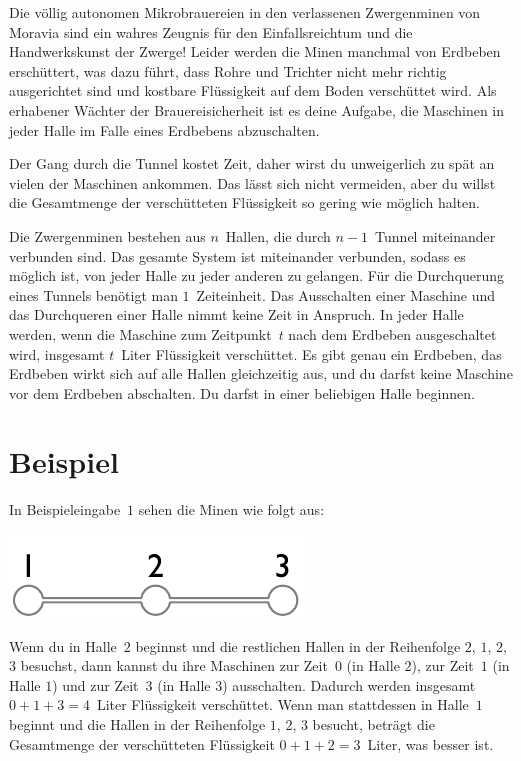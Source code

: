 
\noindent
Die völlig autonomen Mikrobrauereien in den verlassenen Zwergenminen von Moravia sind ein wahres Zeugnis für den Einfallsreichtum und die Handwerkskunst der Zwerge!
Leider werden die Minen manchmal von Erdbeben erschüttert, was dazu führt, dass Rohre und Trichter nicht mehr richtig ausgerichtet sind und kostbare Flüssigkeit auf dem Boden verschüttet wird.
Als erhabener Wächter der Brauereisicherheit ist es deine Aufgabe, die Maschinen in jeder Halle im Falle eines Erdbebens abzuschalten.

Der Gang durch die Tunnel kostet Zeit, 
daher wirst du unweigerlich zu spät an vielen der Maschinen ankommen.
Das lässt sich nicht vermeiden, aber du willst die Gesamtmenge der verschütteten Flüssigkeit so gering wie möglich halten.

\medskip
Die Zwergenminen bestehen aus $n$~Hallen, die durch $n-1$~Tunnel miteinander verbunden sind.
Das gesamte System ist miteinander verbunden, sodass es möglich ist, von jeder Halle zu jeder anderen zu gelangen.
Für die Durchquerung eines Tunnels benötigt man $1$~Zeiteinheit.
Das Ausschalten einer Maschine und das Durchqueren einer Halle nimmt keine Zeit in Anspruch.
In jeder Halle werden, wenn die Maschine zum Zeitpunkt~$t$ nach dem Erdbeben ausgeschaltet wird, insgesamt $t$~Liter Flüssigkeit verschüttet.
Es gibt genau ein Erdbeben, das Erdbeben wirkt sich auf alle Hallen gleichzeitig aus, und du darfst keine Maschine vor dem Erdbeben abschalten.
Du darfst in einer beliebigen Halle beginnen.

\section*{Beispiel}

In Beispieleingabe~$1$ sehen die Minen wie folgt aus:

\includegraphics[width=.2\textwidth]{img/sample-1.pdf}

Wenn du in Halle~$2$ beginnst und die restlichen Hallen in der Reihenfolge $2$, $1$, $2$, $3$ besuchst, dann kannst du ihre Maschinen zur Zeit~$0$ (in Halle $2$), zur Zeit~$1$ (in Halle $1$) und zur Zeit~$3$ (in Halle $3$) ausschalten.
Dadurch werden insgesamt $0+1+3=4$~Liter Flüssigkeit verschüttet.
Wenn man stattdessen in Halle~$1$ beginnt und die Hallen in der Reihenfolge $1$, $2$, $3$ besucht, beträgt die Gesamtmenge der verschütteten Flüssigkeit $0+1+2=3$~Liter, was besser ist.

